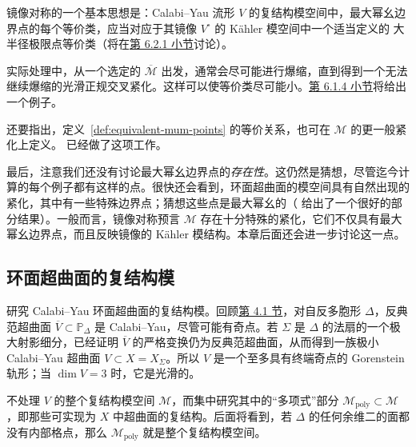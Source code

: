 镜像对称的一个基本思想是：Calabi--Yau 流形 $V$ 的复结构模空间中，最大幂幺边界点的每个等价类，应当对应于其镜像 $V^\circ$ 的 Kähler 模空间中一个适当定义的
大半径极限点等价类（将在\hyperref[subsec:large-radius-limits]{第 6.2.1 小节}讨论）。

实际处理中，从一个选定的 $\overline{\mathcal M}$ 出发，通常会尽可能进行爆缩，直到得到一个无法继续爆缩的光滑正规交叉紧化。这样可以使等价类尽可能小。\hyperref[subsec:two-parameter-moduli]{第 6.1.4 小节}将给出一个例子。

还要指出，定义~\ref{def:equivalent-mum-points} 的等价关系，也可在 $\mathcal M$ 的更一般紧化上定义。 已经做了这项工作。

最后，注意我们还没有讨论最大幂幺边界点的\emph{存在性}。这仍然是猜想，尽管迄今计算的每个例子都有这样的点。很快还会看到，环面超曲面的模空间具有自然出现的紧化，其中有一些特殊边界点；猜想这些点是最大幂幺的（ 给出了一个很好的部分结果）。一般而言，镜像对称预言 $\mathcal M$ 存在十分特殊的紧化，它们不仅具有最大幂幺边界点，而且反映镜像的 Kähler 模结构。本章后面还会进一步讨论这一点。

\subsection{环面超曲面的复结构模}\label{subsec:toric-complex-moduli}
研究 Calabi--Yau 环面超曲面的复结构模。回顾\hyperref[sec:batyrev-mirror]{第 4.1 节}，对自反多胞形 $\Delta$，反典范超曲面 $\overline V\subset\mathbb P_\Delta$ 是 Calabi--Yau，尽管可能有奇点。若 $\Sigma$ 是 $\Delta$ 的法扇的一个极大射影细分，已经证明 $\overline V$ 的严格变换仍为反典范超曲面，从而得到一族极小 Calabi--Yau 超曲面 $V\subset X=X_\Sigma$。所以 $V$ 是一个至多具有终端奇点的 Gorenstein 轨形；当 $\dim V=3$ 时，它是光滑的。

不处理 $V$ 的整个复结构模空间 $\mathcal M$，而集中研究其中的“多项式”部分 $\mathcal M_{\mathrm{poly}}\subset\mathcal M$，即那些可实现为 $X$ 中超曲面的复结构。后面将看到，若 $\Delta$ 的任何余维二的面都没有内部格点，那么 $\mathcal M_{\mathrm{poly}}$ 就是整个复结构模空间。

